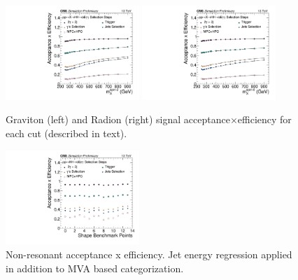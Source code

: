 \begin{figure}[h]
  \centering
  \includegraphics[width=0.45\textwidth]{figures/sec-efficiency_plots/wRegression/res_effs_Graviton_reg.pdf}\hfil
  \includegraphics[width=0.45\textwidth]{figures/sec-efficiency_plots/wRegression/res_effs_Radion_reg.pdf}\hfil
  \caption{Graviton (left) and Radion (right) signal acceptance$\times$efficiency for each cut (described in text).}
  \label{fig:cutflow-res}
\end{figure}

\begin{figure}[h]
  \centering
  \includegraphics[width=0.45\textwidth]{figures/sec-efficiency_plots/wRegression/nonres_effs_reg.pdf}\hfil
  \caption{Non-resonant acceptance x efficiency. Jet energy regression applied in addition to MVA based categorization.}
  \label{fig:cutflow-nonres}
\end{figure}


